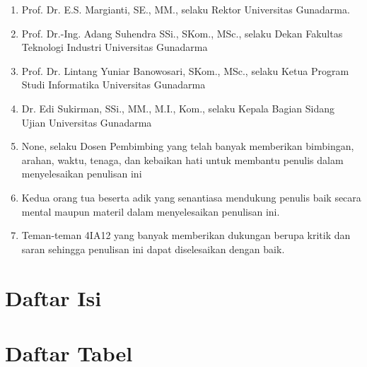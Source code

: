 \documentclass[a4paper]{article}
\newcommand{\fontChapterTitle}{14pt}
\newcommand{\buLintang}{Prof. Dr. Lintang Yuniar Banowosari, SKom., MSc.}
\newcommand{\buMargianti}{Prof. Dr. E.S. Margianti, SE., MM.}
\newcommand{\pakAdang}{Prof. Dr.-Ing. Adang Suhendra SSi., SKom., MSc.}
\newcommand{\pakEdi}{Dr. Edi Sukirman, SSi., MM., M.I., Kom.}
\newcommand{\mySupervisor}{None}
\begin{document}
    \begin{enumerate}
        \item \buMargianti, selaku Rektor Universitas Gunadarma.
        \item \pakAdang, selaku Dekan Fakultas Teknologi Industri Universitas Gunadarma
        \item \buLintang, selaku Ketua Program Studi Informatika Universitas Gunadarma
        \item \pakEdi, selaku Kepala Bagian Sidang Ujian Universitas Gunadarma
        \item \mySupervisor, selaku Dosen Pembimbing yang telah banyak memberikan 
        bimbingan, arahan, waktu, tenaga, dan kebaikan hati untuk membantu penulis dalam
        menyelesaikan penulisan ini
        \item Kedua orang tua beserta adik yang senantiasa mendukung penulis baik secara mental maupun materil
        dalam menyelesaikan penulisan ini.
        \item Teman-teman 4IA12 yang banyak memberikan dukungan berupa kritik dan saran 
        sehingga penulisan ini dapat diselesaikan dengan baik. 
    \end{enumerate}

    \newpage

    {\centering
        {\fontsize{\fontChapterTitle}{0}\selectfont
            \section*{
                Daftar Isi \\[1em]
            } 
        }
        
        \renewcommand{\cftdotsep}{1} %
        \renewcommand{\cftsecleader}{\cftdotfill{\cftdotsep}} %
        \renewcommand{\contentsname}{}
        \setlength{\cftbeforesecskip}{3pt} %
        
        \tableofcontents

    }

    \newpage

    {\centering
        {\fontsize{\fontChapterTitle}{0}\selectfont
            \section*{
                Daftar Tabel \\[1em]
            } 
        }
    }
\end{document}

